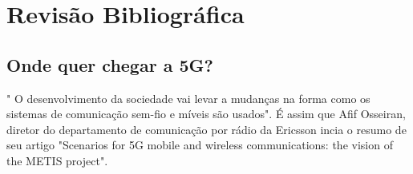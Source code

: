 \chapter{Revisão Bibliográfica} \label{capitulo1}


\section{Onde quer chegar a 5G?} 
" O desenvolvimento da sociedade vai levar a mudanças na forma como os sistemas de comunicação sem-fio e míveis são usados". É assim que Afif Osseiran, diretor do departamento de comunicação por rádio da Ericsson incia o resumo de seu artigo "Scenarios for 5G mobile and wireless communications: the vision of the METIS project".  